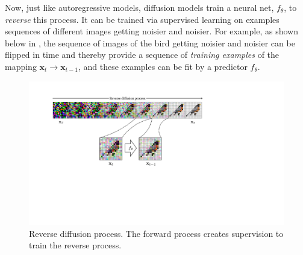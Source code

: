 



Now, just like autoregressive models, diffusion models train a neural net, $f_{\theta}$, to \textit{reverse} this process. It can be trained via supervised learning on examples sequences of different images getting noisier and noisier. For example, as shown below in \fig{\ref{fig:generative_models:reverse_diffusion_process}}, the sequence of images of the bird getting noisier and noisier can be flipped in time and thereby provide a sequence of \textit{training examples} of the mapping $\mathbf{x}_t \rightarrow \mathbf{x}_{t-1}$, and these examples can be fit by a predictor $f_{\theta}$.
\begin{figure}
    \centerline{
        \includegraphics[width=1.0\linewidth]{./figures/generative_models/reverse_diffusion_process.pdf}
    }
    \caption{Reverse diffusion process. The forward process creates supervision to train the reverse process.}
    \label{fig:generative_models:reverse_diffusion_process}
\end{figure}

